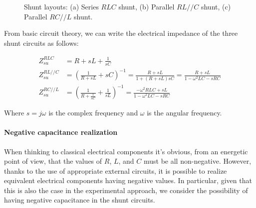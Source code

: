 \begin{figure}[H]
\begin{minipage}{0.31\textwidth}

    \end{minipage}

    \caption{Shunt layouts: (a) Series $RLC$ shunt, (b) Parallel $RL//C$ shunt, (c) Parallel $RC//L$ shunt.}
    \label{fig:shunt_layouts}

\end{figure}

From basic circuit theory, we can write the electrical impedance of the three shunt circuits as follows:

\begin{equation}
    \begin{aligned}
        Z_{su}^{RLC}   & = R + sL + \frac{1}{sC}                                                                                          \\
        Z_{su}^{RL//C} & = \left(\frac{1}{R + sL} + sC\right)^{-1} = \frac{R + sL}{1 + (R + sL)sC} = \frac{R + sL}{1 - \omega^2LC - sRC}  \\
        Z_{su}^{RC//L} & = \left(\frac{1}{R + \frac{1}{sC}} + \frac{1}{sL} \right)^{-1} = \frac{-\omega^2 RLC + sL}{1 - \omega^2LC - sRC}
    \end{aligned}
    \label{eq:shunt_circuits_impedance}
\end{equation}

Where $s = j\omega$ is the complex frequency and $\omega$ is the angular frequency.



\paragraph{Negative capacitance realization}

When thinking to classical electrical components it's obvious, from an energetic point of view, that the values of $R$, $L$, and $C$ must be all non-negative.
However, thanks to the use of appropriate external circuits, it is possible to realize equivalent electrical components having negative values.
In particular, given that this is also the case in the experimental approach, we consider the possibility of having negative capacitance in the shunt circuits.

